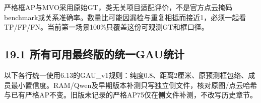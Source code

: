 \documentclass[UTF8,fontset=fandol]{ctexart}
\begin{document}
严格框AP与MVO采用原始GT，类无关项目适配评价，不是官方点云掩码benchmark或关系准确率。数量比可能因漏检与重复相抵而接近1，必须一起看TP/FP/FN。当前第一场景100\%只覆盖这份可观测GT和框口径。



\subsection*{19.1 所有可用最终版的统一GAU统计}

以下各行统一使用6.13的GAU\_v1规则：纯度0.8、距离2厘米、原预测框包络、成员最小置信度。RAM/Qwen及早期版本补测只写独立侧文件，核对原图/点云哈希与已有严格AP不变。旧版未记录的严格AP75仅在侧文件补测，不改写历史章节。
\end{document}

